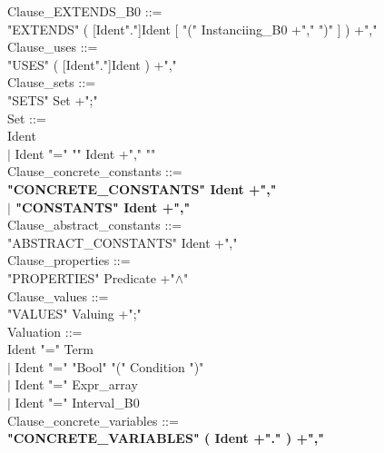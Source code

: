 \documentclass[12pt,a4paper,draft]{article}
\begin{document}
{\begin{sloppypar}
Clause\_EXTENDS\_B0 ::= \\
\hspace*{0.20in}  "EXTENDS" ( [Ident"."]Ident  [ "(" Instanciing\_B0 +","  ")" ] ) +","\\
Clause\_uses ::= \\
\hspace*{0.20in}  "USES" ( [Ident"."]Ident ) +","\\
Clause\_sets ::= \\
\hspace*{0.20in}  "SETS" Set +";"\\
Set ::= \\
\hspace*{0.20in}  Ident \\
\hspace*{0.20in} $|$ Ident  "="  "{" Ident +","  "}" \\
Clause\_concrete\_constants ::= \\
\hspace*{0.20in}  \textbf{"CONCRETE\_CONSTANTS"  Ident +","\\
\hspace*{0.20in} $|$ "CONSTANTS"  Ident +","}\\
Clause\_abstract\_constants ::= \\
\hspace*{0.20in}  "ABSTRACT\_CONSTANTS"  Ident +","\\
Clause\_properties ::= \\
\hspace*{0.20in}  "PROPERTIES"  Predicate +"$\land$"\\
Clause\_values ::= \\
\hspace*{0.20in}  "VALUES"  Valuing +";"\\
Valuation  ::= \\
\hspace*{0.20in}  Ident  "="  Term\\
\hspace*{0.20in} $|$ Ident  "="  "Bool" "(" Condition ")" \\
\hspace*{0.20in} $|$ Ident  "="  Expr\_array\\
\hspace*{0.20in} $|$ Ident  "="  Interval\_B0\\
Clause\_concrete\_variables ::= \\
\hspace*{0.20in}  \textbf{"CONCRETE\_VARIABLES"  ( Ident +"."  ) +","}\\

\end{sloppypar}}
\end{document}
